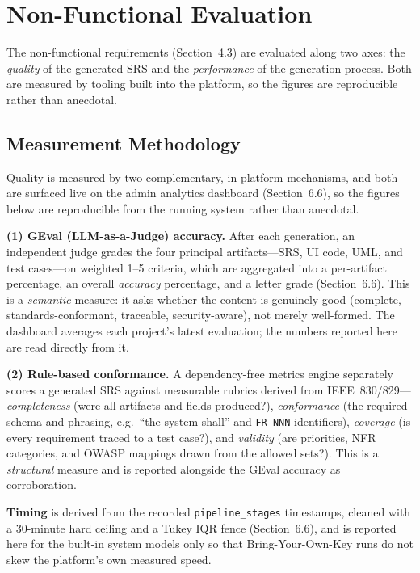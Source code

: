 \documentclass[12pt,a4paper,oneside]{report}
\begin{document}
\section{Non-Functional Evaluation}
The non-functional requirements (Section~4.3) are evaluated along two axes: the \emph{quality} of the generated SRS and the \emph{performance} of the generation process. Both are measured by tooling built into the platform, so the figures are reproducible rather than anecdotal.

\subsection{Measurement Methodology}
Quality is measured by two complementary, in-platform mechanisms, and both are surfaced live on the admin analytics dashboard (Section~6.6), so the figures below are reproducible from the running system rather than anecdotal.

\textbf{(1) GEval (LLM-as-a-Judge) accuracy.} After each generation, an independent judge grades the four principal artifacts---SRS, UI code, UML, and test cases---on weighted 1--5 criteria, which are aggregated into a per-artifact percentage, an overall \emph{accuracy} percentage, and a letter grade (Section~6.6). This is a \emph{semantic} measure: it asks whether the content is genuinely good (complete, standards-conformant, traceable, security-aware), not merely well-formed. The dashboard averages each project's latest evaluation; the numbers reported here are read directly from it.

\textbf{(2) Rule-based conformance.} A dependency-free metrics engine separately scores a generated SRS against measurable rubrics derived from IEEE~830/829---\emph{completeness} (were all artifacts and fields produced?), \emph{conformance} (the required schema and phrasing, e.g.\ ``the system shall'' and \texttt{FR-NNN} identifiers), \emph{coverage} (is every requirement traced to a test case?), and \emph{validity} (are priorities, NFR categories, and OWASP mappings drawn from the allowed sets?). This is a \emph{structural} measure and is reported alongside the GEval accuracy as corroboration.

\textbf{Timing} is derived from the recorded \texttt{pipeline\_stages} timestamps, cleaned with a 30-minute hard ceiling and a Tukey IQR fence (Section~6.6), and is reported here for the built-in system models only so that Bring-Your-Own-Key runs do not skew the platform's own measured speed.
\end{document}
